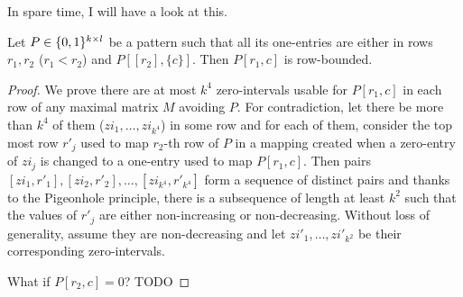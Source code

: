 In spare time, I will have a look at this. 

\begin{lemma}
\label{lemma:cross}
Let $P\in\{0,1\}^{k\times l}$ be a pattern such that all its one-entries are either in rows $r_1,r_2$ ($r_1<r_2$) and $P[[r_2],\{c\}]$. Then $P[r_1,c]$ is row-bounded.
\end{lemma}
\begin{proof}
We prove there are at most $k^4$ zero-intervals usable for $P[r_1,c]$ in each row of any maximal matrix $M$ avoiding $P$. For contradiction, let there be more than $k^4$ of them ($zi_1,\dots,zi_{k^4}$) in some row and for each of them, consider the top most row $r'_j$ used to map $r_2$-th row of $P$ in a mapping created when a zero-entry of $zi_j$ is changed to a one-entry used to map $P[r_1,c]$. Then pairs $[zi_1,r'_1],[zi_2,r'_2],\dots,[zi_{k^4},r'_{k^4}]$ form a sequence of distinct pairs and thanks to the Pigeonhole principle, there is a subsequence of length at least $k^2$ such that the values of $r'_j$ are either non-increasing or non-decreasing. Without loss of generality, assume they are non-decreasing and let $zi'_1,\dots,zi'_{k^2}$ be their corresponding zero-intervals.

What if $P[r_2,c]=0$? TODO
\end{proof}

